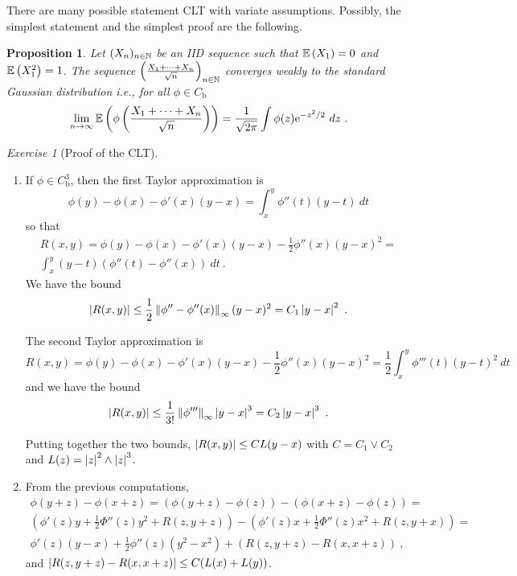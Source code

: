 \documentclass[12pt,a4paper]{amsart}
\theoremstyle{plain}%
\newtheorem{proposition}[thm]{Proposition}
\theoremstyle{definition}
\theoremstyle{remark}
\newtheorem{exercise}{Exercise}
\begin{document}
There are many possible statement CLT with variate
assumptions. Possibly, the simplest statement and the simplest proof are the following.
%
\begin{proposition}Let $(X_n)_{n \in \mathbb{N}}$ be an IID sequence such that $\operatorname{\mathbb E}\left(X_1\right) = 0$ and $\operatorname{\mathbb E}\left(X_1^2\right) = 1$. The sequence $\left(\frac{X_1+\cdots+X_n}{\sqrt n}\right)_{n\in\mathbb{N}}$ converges weakly to the standard Gaussian distribution i.e., for all $\phi \in C_{\text{b}}$
  \begin{equation*}
    \lim_{n \to \infty} \operatorname{\mathbb E}\left(\phi\left(\frac{X_1+\cdots+X_n}{\sqrt n}\right)\right) = \frac1{\sqrt{2\pi}} \int \phi(z) \mathrm{e}^{- z^2/2} \ dz \ .
  \end{equation*}
\end{proposition}

\begin{exercise}[Proof of the CLT]
  \begin{enumerate}
  \item If $\phi \in C^3_{\text{b}}$, then the first Taylor approximation is
    \begin{equation*}
      \phi(y) - \phi(x) - \phi'(x)(y-x) = \int_x^y \phi''(t)(y-t) \ dt 
    \end{equation*}
so that
\begin{multline*}
      R(x,y) = \phi(y) - \phi(x) - \phi'(x)(y-x) -\frac12 \phi''(x)(y-x)^2 = \\ \int_x^y (y-t)(\phi''(t) - \phi''(x)) \ dt \ . 
    \end{multline*}
 We have the bound
 \begin{equation*}
   \left\vert R(x,y)\right\vert \leq \frac12 \left\Vert\phi'' - \phi''(x)\right\Vert_{\infty} (y-x)^2 = C_1 \left\vert y-x\right\vert^2\ .
 \end{equation*}

    The second Taylor approximation is
    \begin{equation*}
     R(x,y) = \phi(y) - \phi(x) - \phi'(x)(y-x) - \frac12 \phi''(x)(y-x)^2 = \frac1{2}\int_x^y \phi'''(t)(y-t)^2 \ dt 
   \end{equation*}
and we have the bound
\begin{equation*}
  \aval{R(x,y)} \leq \frac1{3!} \normat \infty {\phi'''}  \aval{y-x}^3 = C_2 \aval{y-x}^3 \ .
\end{equation*}

Putting together the two bounds, $\left\vert R(x,y)\right\vert \leq C L(y-x)$ with $C = C_1 \vee C_2$ and $L(z) = \left\vert z\right\vert^2 \wedge \left\vert z\right\vert^3$.

\item 
  From the previous computations,
  \begin{multline*}
\phi(y+z) - \phi(x+z) = (\phi(y+z) - \phi(z)) - (\phi(x+z) - \phi(z)) = \\
   \left(\phi'(z)y + \frac12 \Phi''(z)y^2 + R(z,y+z)\right) - \left(\phi'(z)x + \frac12 \Phi''(z)x^2 + R(z,y+x)\right) = \\
   \phi'(z)(y-x) + \frac12 \phi''(z)(y^2-x^2) + \left(R(z,y+z) - R(x,x+z)\right) \ ,
 \end{multline*}
 and $\left\vert R(z,y+z) - R(x,x+z)\right\vert \leq C(L(x) + L(y))$.


\end{enumerate}
\end{exercise}
\end{document}
